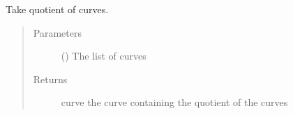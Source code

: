\documentclass[letterpaper,10pt,english]{sphinxmanual}
\begin{document}
\begin{fulllineitems}
\label{\detokenize{pydv:pydvpy.divide}}
Take quotient of curves.

\begin{sphinxVerbatim}[commandchars=\\\{\}]
  
\end{sphinxVerbatim}

\begin{sphinxVerbatim}[commandchars=\\\{\}]
  
\end{sphinxVerbatim}
\begin{quote}\begin{description}
\item[{Parameters}] \leavevmode
{} () \textendash{} The list of curves

\item[{Returns}] \leavevmode
curve \textendash{} the curve containing the quotient of the curves

\end{description}\end{quote}

\end{fulllineitems}

\end{document}
